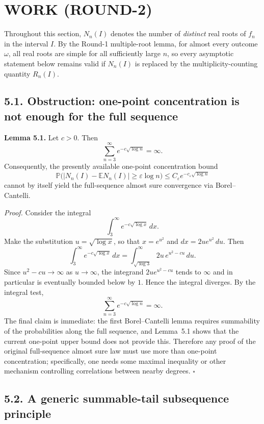 \section{WORK (ROUND-2)}

Throughout this section, $N_n(I)$ denotes the number of \emph{distinct} real roots of $f_n$ in the interval $I$. By the Round-1 multiple-root lemma, for almost every outcome $\omega$, all real roots are simple for all sufficiently large $n$, so every asymptotic statement below remains valid if $N_n(I)$ is replaced by the multiplicity-counting quantity $R_n(I)$.

\subsection*{5.1. Obstruction: one-point concentration is not enough for the full sequence}

\medskip
\noindent\textbf{Lemma 5.1.}
Let $c>0$. Then
\[
\sum_{n=3}^\infty e^{-c\sqrt{\log n}}=\infty.
\]
Consequently, the presently available one-point concentration bound
\[
\mathbb P\bigl(|N_n(I)-\mathbb E N_n(I)|\ge \varepsilon\log n\bigr)
\le C_\varepsilon e^{-c_\varepsilon\sqrt{\log n}}
\]
cannot by itself yield the full-sequence almost sure convergence via Borel--Cantelli.

\medskip
\noindent\emph{Proof.}
Consider the integral
\[
\int_3^\infty e^{-c\sqrt{\log x}}\,dx.
\]
Make the substitution $u=\sqrt{\log x}$, so that $x=e^{u^2}$ and $dx=2u e^{u^2}\,du$. Then
\[
\int_3^\infty e^{-c\sqrt{\log x}}\,dx
=\int_{\sqrt{\log 3}}^\infty 2u\,e^{u^2-cu}\,du.
\]
Since $u^2-cu\to\infty$ as $u\to\infty$, the integrand $2u e^{u^2-cu}$ tends to $\infty$ and in particular is eventually bounded below by $1$. Hence the integral diverges. By the integral test,
\[
\sum_{n=3}^\infty e^{-c\sqrt{\log n}}=\infty.
\]
The final claim is immediate: the first Borel--Cantelli lemma requires summability of the probabilities along the full sequence, and Lemma~5.1 shows that the current one-point upper bound does not provide this. Therefore any proof of the original full-sequence almost sure law must use more than one-point concentration; specifically, one needs some maximal inequality or other mechanism controlling correlations between nearby degrees.
\hfill$\square$

\subsection*{5.2. A generic summable-tail subsequence principle}

